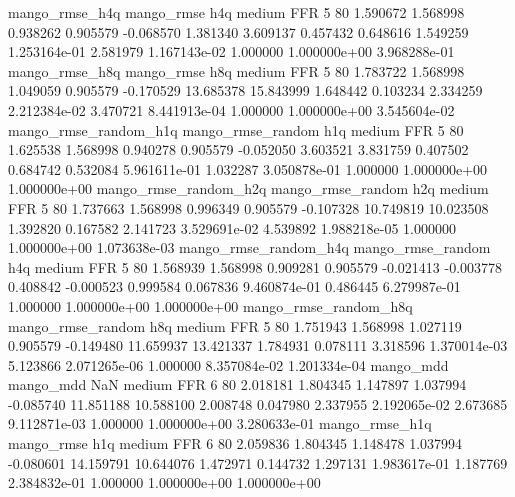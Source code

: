        mango_rmse_h4q        mango_rmse                  h4q     medium      FFR                 5 80  1.590672       1.568998 0.938262       0.905579   -0.068570      1.381340      3.609137     0.457432       0.648616  1.549259 1.253164e-01     2.581979   1.167143e-02            1.000000    1.000000e+00        3.968288e-01
       mango_rmse_h8q        mango_rmse                  h8q     medium      FFR                 5 80  1.783722       1.568998 1.049059       0.905579   -0.170529     13.685378     15.843999     1.648442       0.103234  2.334259 2.212384e-02     3.470721   8.441913e-04            1.000000    1.000000e+00        3.545604e-02
mango_rmse_random_h1q mango_rmse_random                  h1q     medium      FFR                 5 80  1.625538       1.568998 0.940278       0.905579   -0.052050      3.603521      3.831759     0.407502       0.684742  0.532084 5.961611e-01     1.032287   3.050878e-01            1.000000    1.000000e+00        1.000000e+00
mango_rmse_random_h2q mango_rmse_random                  h2q     medium      FFR                 5 80  1.737663       1.568998 0.996349       0.905579   -0.107328     10.749819     10.023508     1.392820       0.167582  2.141723 3.529691e-02     4.539892   1.988218e-05            1.000000    1.000000e+00        1.073638e-03
mango_rmse_random_h4q mango_rmse_random                  h4q     medium      FFR                 5 80  1.568939       1.568998 0.909281       0.905579   -0.021413     -0.003778      0.408842    -0.000523       0.999584  0.067836 9.460874e-01     0.486445   6.279987e-01            1.000000    1.000000e+00        1.000000e+00
mango_rmse_random_h8q mango_rmse_random                  h8q     medium      FFR                 5 80  1.751943       1.568998 1.027119       0.905579   -0.149480     11.659937     13.421337     1.784931       0.078111  3.318596 1.370014e-03     5.123866   2.071265e-06            1.000000    8.357084e-02        1.201334e-04
            mango_mdd         mango_mdd                  NaN     medium      FFR                 6 80  2.018181       1.804345 1.147897       1.037994   -0.085740     11.851188     10.588100     2.008748       0.047980  2.337955 2.192065e-02     2.673685   9.112871e-03            1.000000    1.000000e+00        3.280633e-01
       mango_rmse_h1q        mango_rmse                  h1q     medium      FFR                 6 80  2.059836       1.804345 1.148478       1.037994   -0.080601     14.159791     10.644076     1.472971       0.144732  1.297131 1.983617e-01     1.187769   2.384832e-01            1.000000    1.000000e+00        1.000000e+00
